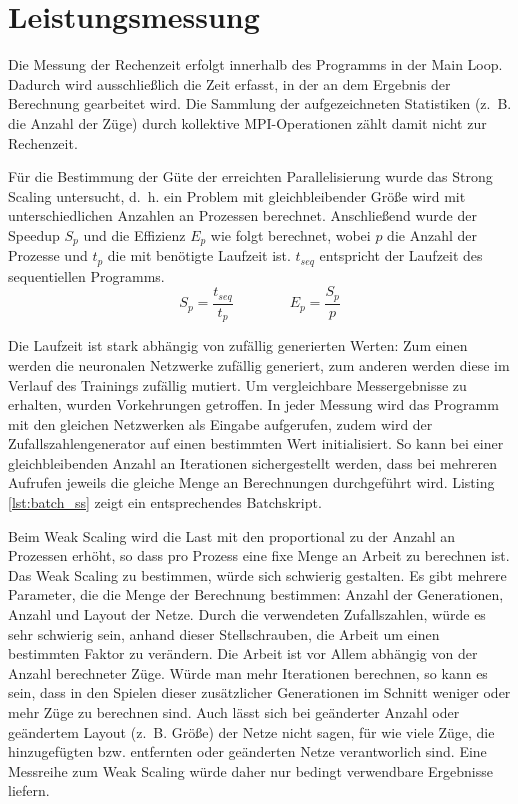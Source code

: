\section{Leistungsmessung}

Die Messung der Rechenzeit erfolgt innerhalb des Programms in der Main Loop.
Dadurch wird ausschließlich die Zeit erfasst, in der an dem Ergebnis der
Berechnung gearbeitet wird.  Die Sammlung der aufgezeichneten Statistiken
(z.~B. die Anzahl der Züge) durch kollektive MPI-Operationen zählt damit nicht
zur Rechenzeit.

Für die Bestimmung der Güte der erreichten Parallelisierung wurde das Strong
Scaling untersucht, d.~h. ein Problem mit gleichbleibender Größe wird mit
unterschiedlichen Anzahlen an Prozessen berechnet. Anschließend wurde der
Speedup $S_p$ und die Effizienz  $E_p$ wie folgt berechnet, wobei $p$ die
Anzahl der Prozesse und $t_p$ die mit benötigte Laufzeit ist. $t_{seq}$
entspricht der Laufzeit des sequentiellen Programms.
\begin{equation*}
    S_p = \frac{t_{seq}}{t_p} \qquad\qquad E_p = \frac{S_p}{p}
\end{equation*}

Die Laufzeit ist stark abhängig von zufällig generierten Werten: Zum einen
werden die neuronalen Netzwerke zufällig generiert, zum anderen werden diese im
Verlauf des Trainings zufällig mutiert.  Um vergleichbare Messergebnisse zu
erhalten, wurden Vorkehrungen getroffen.  In jeder Messung wird das Programm
mit den gleichen Netzwerken als Eingabe aufgerufen, zudem wird der
Zufallszahlengenerator auf einen bestimmten Wert initialisiert. So kann bei
einer gleichbleibenden Anzahl an Iterationen sichergestellt werden, dass bei
mehreren Aufrufen jeweils die gleiche Menge an Berechnungen durchgeführt wird.
Listing \ref{lst:batch_ss} zeigt ein entsprechendes Batchskript.



Beim Weak Scaling wird die Last mit den proportional zu der Anzahl an Prozessen
erhöht, so dass pro Prozess eine fixe Menge an Arbeit zu berechnen ist.  Das
Weak Scaling zu bestimmen, würde sich schwierig gestalten. Es gibt mehrere
Parameter, die die Menge der Berechnung bestimmen: Anzahl der Generationen,
Anzahl und Layout der Netze. Durch die verwendeten Zufallszahlen, würde es sehr
schwierig sein, anhand dieser Stellschrauben, die Arbeit um einen bestimmten
Faktor zu verändern. Die Arbeit ist vor Allem abhängig von der Anzahl
berechneter Züge.  Würde man mehr Iterationen berechnen, so kann es sein, dass
in den Spielen dieser zusätzlicher Generationen im Schnitt weniger oder mehr
Züge zu berechnen sind. Auch lässt sich bei geänderter Anzahl oder geändertem
Layout (z.~B. Größe) der Netze nicht sagen, für wie viele Züge, die
hinzugefügten bzw. entfernten oder geänderten Netze verantworlich sind.  Eine
Messreihe zum Weak Scaling würde daher nur bedingt verwendbare Ergebnisse
liefern.
